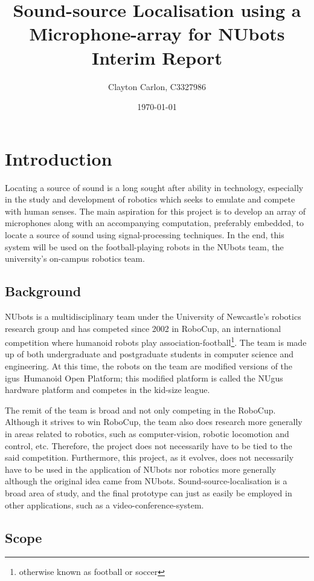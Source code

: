 \documentclass{report}
\title{
	Sound-source Localisation using a Microphone-array for NUbots\\
	Interim Report
}
\author{Clayton Carlon, C3327986}
\date{\today}
\begin{document}
\maketitle

\chapter{Introduction}

Locating a source of sound is a long sought after ability in technology, especially in the study and development of robotics which seeks to emulate and compete with human senses. The main aspiration for this project is to develop an array of microphones along with an accompanying computation, preferably embedded, to locate a source of sound using signal-processing techniques. In the end, this system will be used on the football-playing robots in the NUbots team, the university's on-campus robotics team.

\section{Background}

NUbots is a multidisciplinary team under the University of Newcastle's robotics research group and has competed since 2002 in RoboCup, an international competition where humanoid robots play association-football\footnote{otherwise known as football or soccer}. The team is made up of both undergraduate and postgraduate students in computer science and engineering. At this time, the robots on the team are modified versions of the igus\textregistered\ Humanoid Open Platform; this modified platform is called the NUgus hardware platform and competes in the kid-size league.

The remit of the team is broad and not only competing in the RoboCup. Although it strives to win RoboCup, the team also does research more generally in areas related to robotics, such as computer-vision, robotic locomotion and control, etc. Therefore, the project does not necessarily have to be tied to the said competition. Furthermore, this project, as it evolves, does not necessarily have to be used in the application of NUbots nor robotics more generally although the original idea came from NUbots. Sound-source-localisation is a broad area of study, and the final prototype can just as easily be employed in other applications, such as a video-conference-system.

\section{Scope}
\end{document}
